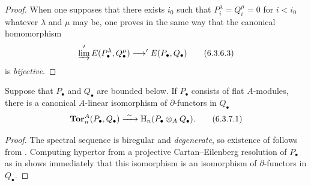 \begin{proof}
When one supposes that there exists $i_0$ such that
$P_i^\lambda=Q_i^\mu=0$ for $i<i_0$ whatever $\lambda$ and $\mu$ may be, one
proves in the same way that the canonical homomorphism
\[
  \varinjlim'E(P_\bullet^\lambda,Q_\bullet^\mu)
  \longrightarrow
  'E(P_\bullet,Q_\bullet)
  \tag{6.3.6.3}\label{III.6.3.6.3}
\]
is \emph{bijective}.
\end{proof}

\begin{proposition}[6.3.7]
\label{III.6.3.7}
Suppose that $P_\bullet$ and $Q_\bullet$ are bounded below.  If
$P_\bullet$ consists of flat $A$-modules, there is a canonical
$A$-linear isomorphism of $\partial$-functors in $Q_\bullet$
\[
  \mathbf{Tor}_n^A(P_\bullet,Q_\bullet)
  \xrightarrow{\ \sim\ }
  \mathrm{H}_n(P_\bullet\otimes_AQ_\bullet).
  \tag{6.3.7.1}\label{III.6.3.7.1}
\]
\end{proposition}

\begin{proof}
The spectral sequence  is biregular and
\emph{degenerate}, so existence of  follows from
.  Computing hypertor from a projective
Cartan--Eilenberg resolution of $P_\bullet$ as in
 shows immediately that this isomorphism is an
isomorphism of $\partial$-functors in $Q_\bullet$.
\end{proof}

